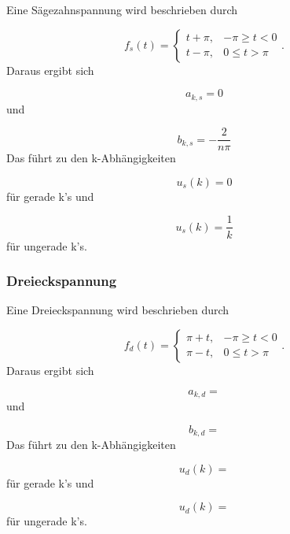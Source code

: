 Eine Sägezahnspannung wird beschrieben durch

\begin{equation}
  f_s(t) =
  \begin{cases}
    t + \pi, & -\pi \geq t < 0 \\
    t - \pi, & 0 \leq t > \pi
  \end{cases}.
\end{equation}
Daraus ergibt sich

\begin{equation}
  a_{k,s} = 0
\end{equation}
und

\begin{equation}
  b_{k,s} = -\frac{2}{n\pi}
\end{equation}
Das führt zu den k-Abhängigkeiten

\begin{equation}
  u_s(k) = 0
\end{equation}
für gerade k's und

\begin{equation}
  u_s(k) = \frac{1}{k}
\end{equation}
für ungerade k's.

\subsubsection{Dreieckspannung}

Eine Dreieckspannung wird beschrieben durch

\begin{equation}
  f_d(t) =
  \begin{cases}
    \pi + t, & -\pi \geq t < 0 \\
    \pi - t, & 0 \leq t > \pi
  \end{cases}.
\end{equation}
Daraus ergibt sich

\begin{equation}
  a_{k,d} =
\end{equation}
und

\begin{equation}
  b_{k,d} =
\end{equation}
Das führt zu den k-Abhängigkeiten

\begin{equation}
  u_d(k) =
\end{equation}
für gerade k's und

\begin{equation}
  u_d(k) =
\end{equation}
für ungerade k's.

